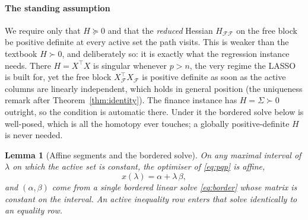 \documentclass[sts]{imsart}
\newcommand{\Sig}{\Sigma}
\newcommand{\F}{\mathcal{F}}
\newcommand{\trans}{^{\top}}
\theoremstyle{plain}
\newtheorem{lemma}{Lemma}
\theoremstyle{definition}
\begin{document}
\paragraph{The standing assumption} We require only that $H\succeq0$ and that the
\emph{reduced} Hessian $H_{\F\F}$ on the free block be positive definite at every
active set the path visits. This is weaker than the textbook $H\succ0$, and
deliberately so: it is exactly what the regression instance needs. There
$H=X\trans X$ is singular whenever $p>n$, the very regime the LASSO is built for, yet
the free block $X_\F\trans X_\F$ is positive definite as soon as the active columns are
linearly independent, which holds in general position (the uniqueness remark after
Theorem~\ref{thm:identity}). The finance instance has $H=\Sig\succ0$ outright, so the
condition is automatic there. Under it the bordered solve below is well-posed, which is
all the homotopy ever touches; a globally positive-definite $H$ is never needed.

\begin{lemma}[Affine segments and the bordered solve]
\label{lem:affine}
On any maximal interval of $\lambda$ on which the active set is constant, the optimiser
of \eqref{eq:pqp} is affine,
\begin{equation}
\label{eq:affine}
x(\lambda) = \alpha + \lambda\,\beta ,
\end{equation}
and $(\alpha,\beta)$ come from a single bordered linear solve \eqref{eq:border} whose
matrix is constant on the interval. An active inequality row enters that solve
identically to an equality row.
\end{lemma}
\end{document}
